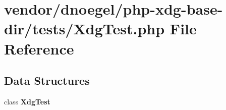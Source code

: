 \section{vendor/dnoegel/php-\/xdg-\/base-\/dir/tests/\+Xdg\+Test.php File Reference}
\label{_xdg_test_8php}
\subsection*{Data Structures}
\begin{DoxyCompactItemize}
\item 
class {\bf Xdg\+Test}
\end{DoxyCompactItemize}
